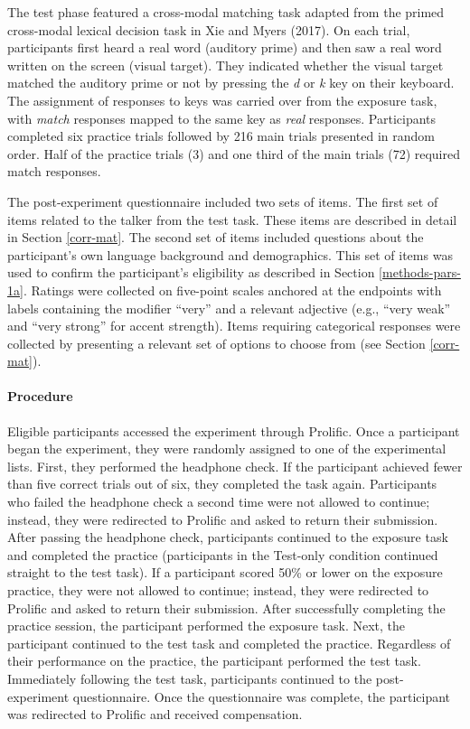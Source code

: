 \documentclass[
  12pt,
  twoside]{article}
\begin{document}
The test phase featured a cross-modal matching task adapted from the primed cross-modal lexical decision task in Xie and Myers (2017).
On each trial, participants first heard a real word (auditory prime) and then saw a real word written on the screen (visual target).
They indicated whether the visual target matched the auditory prime or not by pressing the \emph{d} or \emph{k} key on their keyboard.
The assignment of responses to keys was carried over from the exposure task, with \emph{match} responses mapped to the same key as \emph{real} responses.
Participants completed six practice trials followed by 216 main trials presented in random order.
Half of the practice trials (3) and one third of the main trials (72) required match responses.

The post-experiment questionnaire included two sets of items.
The first set of items related to the talker from the test task.
These items are described in detail in Section \ref{corr-mat}.
The second set of items included questions about the participant's own language background and demographics.
This set of items was used to confirm the participant's eligibility as described in Section \ref{methods-pars-1a}.
Ratings were collected on five-point scales anchored at the endpoints with labels containing the modifier ``very'' and a relevant adjective (e.g., ``very weak'' and ``very strong'' for accent strength).
Items requiring categorical responses were collected by presenting a relevant set of options to choose from (see Section \ref{corr-mat}).

\hypertarget{methods-proc}{%
\paragraph{Procedure}\label{methods-proc}}

Eligible participants accessed the experiment through Prolific.
Once a participant began the experiment, they were randomly assigned to one of the experimental lists.
First, they performed the headphone check.
If the participant achieved fewer than five correct trials out of six, they completed the task again.
Participants who failed the headphone check a second time were not allowed to continue; instead, they were redirected to Prolific and asked to return their submission.
After passing the headphone check, participants continued to the exposure task and completed the practice (participants in the Test-only condition continued straight to the test task).
If a participant scored 50\% or lower on the exposure practice, they were not allowed to continue; instead, they were redirected to Prolific and asked to return their submission.
After successfully completing the practice session, the participant performed the exposure task.
Next, the participant continued to the test task and completed the practice.
Regardless of their performance on the practice, the participant performed the test task.
Immediately following the test task, participants continued to the post-experiment questionnaire.
Once the questionnaire was complete, the participant was redirected to Prolific and received compensation.
\end{document}

